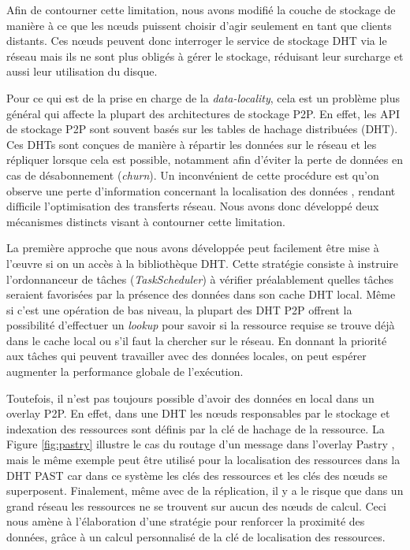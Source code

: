 Afin de contourner cette limitation, nous avons modifié la couche de stockage de manière à ce que les n{\oe}uds puissent choisir d'agir seulement en tant que clients distants. Ces n{\oe}uds peuvent donc interroger le service de stockage DHT via le réseau mais ils ne sont plus obligés à gérer le stockage, réduisant leur surcharge et aussi leur utilisation du disque.

Pour ce qui est de la prise en charge de la \textit{data-locality}, cela est un problème plus général qui affecte la plupart des architectures de stockage P2P. En effet, les API de stockage P2P sont souvent basés sur les tables de hachage distribuées (DHT). Ces DHTs sont conçues de manière à répartir les données sur le réseau et les répliquer lorsque cela est possible, notamment afin d'éviter la perte de données en cas de désabonnement (\textit{churn}). Un inconvénient de cette procédure est qu'on observe une perte d'information concernant la localisation des données \cite{Wu2005}, rendant difficile l'optimisation des transferts réseau. Nous avons donc développé deux mécanismes distincts visant à contourner cette limitation. 

La première approche que nous avons développée peut facilement être mise à l'{\oe}uvre si on un accès à la bibliothèque DHT. Cette stratégie consiste à instruire l'ordonnanceur de tâches (\textit{TaskScheduler}) à vérifier préalablement quelles tâches seraient favorisées par la présence des données dans son cache DHT local. Même si c'est une opération de bas niveau, la plupart des DHT P2P offrent la possibilité d'effectuer un \textit{lookup} pour savoir si la ressource requise se trouve déjà dans le cache local ou s'il faut la chercher sur le réseau. En donnant la priorité aux tâches qui peuvent travailler avec des données locales, on peut espérer augmenter la performance globale de l'exécution.

Toutefois, il n'est pas toujours possible d'avoir des données en local dans un overlay P2P. En effet, dans une DHT les n{\oe}uds responsables par le stockage et indexation des ressources sont définis par la clé de hachage de la ressource. La Figure \ref{fig:pastry} illustre le cas du routage d'un message dans l'overlay Pastry \cite{Pastry01, Castro2002}, mais le même exemple peut être utilisé pour la localisation des ressources dans la DHT PAST \cite{Rowstron2001b} car dans ce système les clés des ressources et les clés des n{\oe}uds se superposent. Finalement, même avec de la réplication, il y a le risque que dans un grand réseau les ressources ne se trouvent sur aucun des n{\oe}uds de calcul. Ceci nous amène à l'élaboration d'une stratégie pour renforcer la proximité des données, grâce à un calcul personnalisé de la clé de localisation des ressources. 



